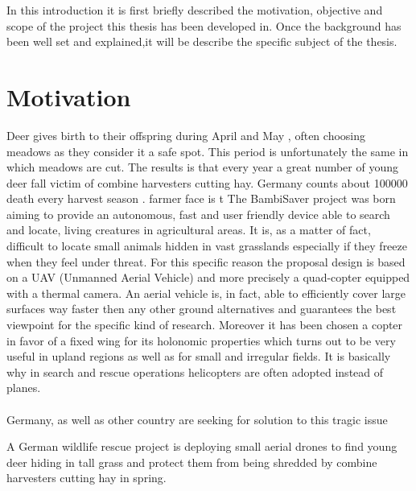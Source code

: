 


In this introduction it is first briefly described the motivation, objective and scope of the project this thesis has been developed in. Once the background has been well set and explained,it will be describe the specific subject of the thesis.


\section{Motivation} %
\label{sec:motivation}
 Deer gives birth to their offspring during April and May \cite{MowlingMortality}, often choosing meadows as they consider it a safe spot. This period is unfortunately the same in which meadows are cut. The results is that every year a great number of young deer fall victim of combine harvesters cutting hay. Germany counts about 100000 death every harvest season \cite{MowlingMortality}.
  farmer face is t The BambiSaver project was born aiming to provide an autonomous, fast and user friendly device able to search and locate, living creatures in agricultural areas. It is, as a matter of fact, difficult to locate small animals hidden in vast grasslands especially if they freeze when they feel under threat. For this specific reason the proposal design is based on a UAV (Unmanned Aerial Vehicle)  \cite{ICAO} and more precisely a quad-copter equipped with a thermal camera. 
  An aerial vehicle is, in fact, able to efficiently cover large surfaces way faster then any other ground alternatives and guarantees the best viewpoint for the specific kind of research. Moreover it has been chosen a copter in favor of a fixed wing for its holonomic properties which turns out to be very useful in upland regions as well as for small and irregular fields. It is basically why in search and rescue operations helicopters are often adopted instead of planes.
\\
\\

 Germany, as well as other country are seeking for solution to this tragic issue


A German wildlife rescue project is deploying small aerial drones to find young deer hiding in tall grass and protect them from being shredded by combine harvesters cutting hay in spring.{}



